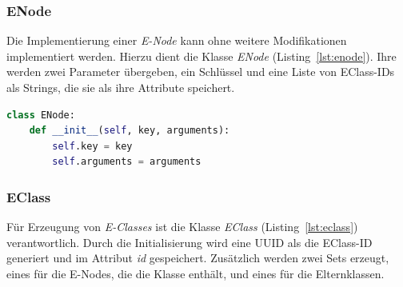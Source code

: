 






\subsubsection{ENode}

Die Implementierung einer \textit{E-Node} kann ohne weitere Modifikationen implementiert werden. Hierzu dient die Klasse \textit{ENode} (Listing~\ref{lst:enode}).
Ihre werden zwei Parameter übergeben, ein Schlüssel und eine Liste von EClass-IDs als Strings, die sie als ihre Attribute speichert.

\begin{lstlisting}[language=Python, caption=Klasse \textit{ENode}, label={lst:enode}]
class ENode:
    def __init__(self, key, arguments):
        self.key = key
        self.arguments = arguments
\end{lstlisting}

\subsubsection{EClass}

Für Erzeugung von \textit{E-Classes} ist die Klasse \textit{EClass} (Listing~\ref{lst:eclass}) verantwortlich. Durch die Initialisierung wird eine UUID als die EClass-ID generiert 
und im Attribut \textit{id} gespeichert. Zusätzlich werden zwei Sets erzeugt, eines für die E-Nodes, die die Klasse enthält, und eines für die Elternklassen.

